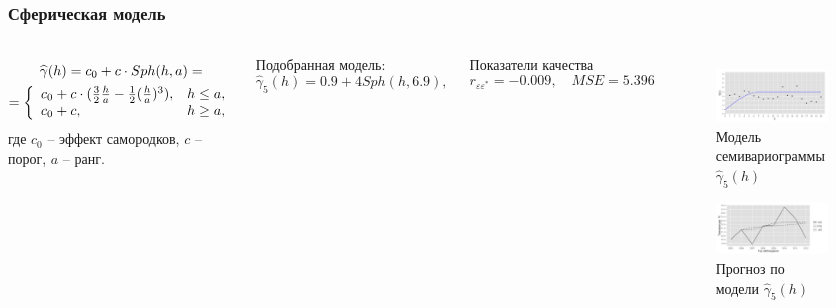 \documentclass[10pt,pdf,aspectratio=169,hyperref={unicode}]{beamer}
\begin{document}
\begin{frame}
  \frametitle{Сферическая модель}
  \begin{columns}[c]
  \column{3in}
  \begin{equation}\begin{gathered}
  \label{eq:sph}
    \widehat{\gamma}(h) = c_0 + c \cdot Sph(h, a) = \\
    = \left\{
    \begin{array}{l l}
      c_0 + c \cdot (\frac{3}{2} \frac{h}{a} - \frac{1}{2}(\frac{h}{a})^3), & h \le a, \\
      c_0 + c, & h \geq a,
    \end{array} \right.
  \end{gathered}\end{equation}
  где $ c_0 $ -- эффект самородков, $ c $ -- порог, $ a $ -- ранг.

  \vspace{0.5em}

  Подобранная модель:
  \begin{equation}
  \label{eq:gamma5}
    \widehat{\gamma}_5(h) = 0.9 + 4 Sph(h, 6.9),
  \end{equation}

  Показатели качества
  \begin{equation*}
    r_{\varepsilon\varepsilon^{*}} = -0.009, \quad MSE = 5.396
  \end{equation*}

  \column{3in}
  \vspace{-14.5pt}
  \begin{figure}[H]
    \includegraphics[width=0.9\linewidth]{../../figures/variogram/sph-fit-adapt-modeled.png} \\
    \caption{Модель семивариограммы $\widehat{\gamma}_5(h)$}
    \includegraphics[width=0.9\linewidth]{../../figures/variogram/sph-fit-adapt-cross-prediction.png}
    \caption{Прогноз по модели $\widehat{\gamma}_5(h)$}
  \end{figure}
  \end{columns}
\end{frame}
\end{document}
